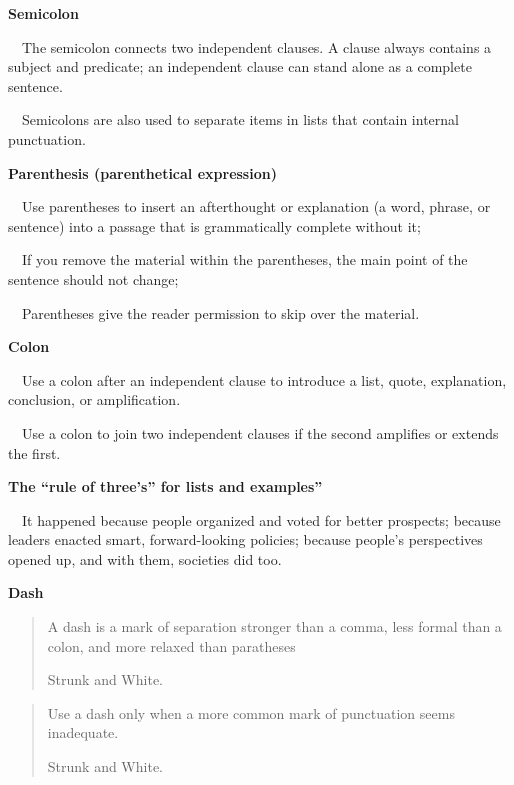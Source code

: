 \documentclass[a4paper, 12pt]{article}
\begin{document}
\textbf{Semicolon}
\par\ \textbullet\ The semicolon connects two independent clauses. A clause always contains a subject and predicate; an independent clause can stand alone as a complete sentence.
\par\ \textbullet\ Semicolons are also used to separate items in lists that contain internal punctuation.

\textbf{Parenthesis (parenthetical expression)}
\par\ \textbullet\ Use parentheses to insert an afterthought or explanation (a word, phrase, or sentence) into a passage that is grammatically complete without it;
\par\ \textbullet\ If you remove the material within the parentheses, the main point of the sentence should not change;
\par\ \textbullet\ Parentheses give the reader permission to skip over the material.

\textbf{Colon}
\par\ \textbullet\ Use a colon after an independent clause to introduce a list, quote, explanation, conclusion, or amplification.
\par\ \textbullet\ Use a colon to join two independent clauses if the second amplifies or extends the first.

\textbf{The ``rule of three's'' for lists and examples''}
\par\ \textbullet\ It happened because people organized and voted for better prospects; because leaders enacted smart,
forward-looking policies; because people's perspectives opened up, and with them, societies did too.

\newpage\textbf{Dash}

\vspace{4pt}\begin{quote}
    A dash is a mark of separation stronger than a comma, less formal than a colon, and more relaxed than paratheses
\begin{flushright}
Strunk and White.
\end{flushright}
\end{quote}

\vspace{4pt}\begin{quote}
    Use a dash only when a more common mark of punctuation seems inadequate.
\begin{flushright}
Strunk and White.
\end{flushright}
\end{quote}
\end{document}
